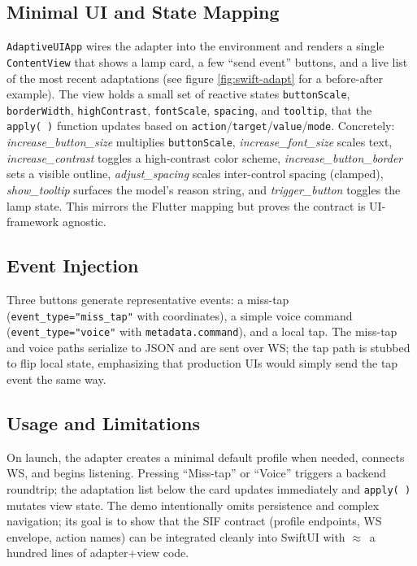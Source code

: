 \documentclass[openany]{book}
\begin{document}
\subsection{Minimal UI and State Mapping}
\texttt{AdaptiveUIApp} wires the adapter into the environment and renders a single \texttt{ContentView} that shows a lamp card, a few “send event” buttons, and a live list of the most recent adaptations (see figure \ref{fig:swift-adapt} for a before-after example). The view holds a small set of reactive states \texttt{buttonScale}, \texttt{borderWidth}, \texttt{highContrast}, \texttt{fontScale}, \texttt{spacing}, and \texttt{tooltip}, that the \texttt{apply(\,)} function updates based on \texttt{action}/\texttt{target}/\texttt{value}/\texttt{mode}. Concretely:  
\emph{increase\_button\_size} multiplies \texttt{buttonScale}, \emph{increase\_font\_size} scales text, \emph{increase\_contrast} toggles a high-contrast color scheme, \emph{increase\_button\_border} sets a visible outline, \emph{adjust\_spacing} scales inter-control spacing (clamped), \emph{show\_tooltip} surfaces the model’s reason string, and \emph{trigger\_button} toggles the lamp state. This mirrors the Flutter mapping but proves the contract is UI-framework agnostic. 

\subsection{Event Injection}
Three buttons generate representative events: a miss-tap (\texttt{event\_type="miss\_tap"} with coordinates), a simple voice command (\texttt{event\_type="voice"} with \texttt{metadata.command}), and a local tap. The miss-tap and voice paths serialize to JSON and are sent over WS; the tap path is stubbed to flip local state, emphasizing that production UIs would simply send the tap event the same way. 

\subsection{Usage and Limitations}
On launch, the adapter creates a minimal default profile when needed, connects WS, and begins listening. Pressing “Miss-tap” or “Voice” triggers a backend roundtrip; the adaptation list below the card updates immediately and \texttt{apply(\,)} mutates view state. The demo intentionally omits persistence and complex navigation; its goal is to show that the SIF contract (profile endpoints, WS envelope, action names) can be integrated cleanly into SwiftUI with \(\approx\)~a hundred lines of adapter+view code.
\end{document}
